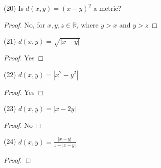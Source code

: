 \documentclass{amsart}
\numberwithin{equation}{section}
\theoremstyle{plain}
\theoremstyle{definition}
\begin{document}
\begin{enumerate}
\begin{proof}
    and not subset of $\{p_i\}$ is an open cover of $E$.
  \end{proof}
  \item[(20)] Is $d(x,y) = (x -y)^2$ a metric?
  \begin{proof}
    No, for $x,y,z \in \mathbb{R}$, where $y > x$ and $y > z$
  \end{proof}
  \item[(21)] $d(x,y) = \sqrt{|x - y|}$
  \begin{proof}
    Yes
  \end{proof}
  \item[(22)] $d(x,y) = |x^2 - y^2|$
  \begin{proof}
    Yes
  \end{proof}
  \item[(23)] $d(x,y) = |x - 2y|$ 
  \begin{proof}
    No
  \end{proof}
  \item[(24)] $d(x,y) = \frac{|x - y|}{1 + |x - y|} $
  \begin{proof}


\end{proof}
\end{enumerate}
\end{document}
